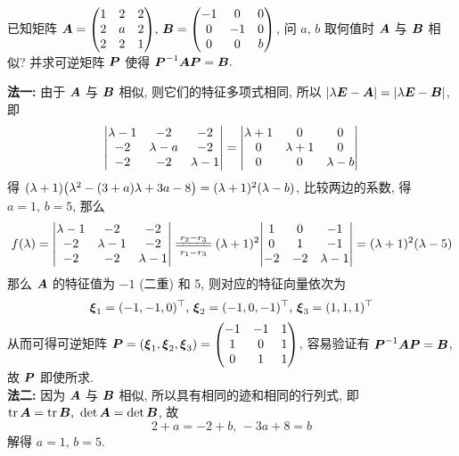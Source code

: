 \begin{example}[2009 兰州大学]
    已知矩阵 $\vb*{A}=\mqty(1&2&2\\2&a&2\\2&2&1)\text{, }\vb*{B}=\mqty(-1&0&0\\0&-1&0\\0&0&b)$, 问 $a\text{, }b$ 取何值时 $\vb*{A}$ 与 $\vb*{B}$ 相似? 并求可逆矩阵 $\vb*{P}$ 使得 $\vb*{P}^{-1}\vb*{AP}=\vb*{B}.$
\end{example}
\begin{solution}
    \textbf{法一: }由于 $\vb*{A}$ 与 $\vb*{B}$ 相似, 则它们的特征多项式相同, 所以 $|\lambda\vb*{E}-\vb*{A}|=|\lambda\vb*{E}-\vb*{B}|$, 即
    $$\mqty|\lambda-1 &-2 &-2\\-2 &\lambda-a &-2\\-2 &-2 &\lambda-1|=\mqty|\lambda+1 &0 &0\\0 &\lambda+1 &0\\0 &0 &\lambda-b|$$
    得 $(\lambda+1)\qty(\lambda^2-(3+a)\lambda+3a-8)=(\lambda+1)^2(\lambda-b)$, 比较两边的系数, 得 $a=1\text{, }b=5$, 那么
    $$f(\lambda)=\mqty|\lambda-1 &-2 &-2\\-2 &\lambda-1 &-2\\-2 &-2 &\lambda-1|\xlongequal[r_1-r_3]{r_2-r_3}(\lambda+1)^2\mqty|1 &0 &-1\\0 &1 &-1\\-2 &-2 &\lambda-1|=(\lambda+1)^2(\lambda-5)$$
    那么 $\vb*{A}$ 的特征值为 $-1$ (二重) 和 5, 则对应的特征向量依次为
    $$\vb*{\xi}_1=(-1,-1,0)^{\top}\text{, }\vb*{\xi}_2=(-1,0,-1)^{\top}\text{, }\vb*{\xi}_3=(1,1,1)^{\top}$$
    从而可得可逆矩阵 $\vb*{P}=(\vb*{\xi}_1,\vb*{\xi}_2,\vb*{\xi}_3)=\mqty(-1 &-1 &1\\1 &0 &1\\0 &1 &1)$, 容易验证有 $\vb*{P}^{-1}\vb*{AP}=\vb*{B}$, 故 $\vb*{P}$ 即使所求.\\
    \textbf{法二: }因为 $\vb*{A}$ 与 $\vb*{B}$ 相似, 所以具有相同的迹和相同的行列式, 即 $\tr\vb*{A}=\tr\vb*{B}\text{, }\det \vb*{A}=\det\vb*{B}$, 故
    $$2+a=-2+b\text{, }-3a+8=b$$ 解得 $a=1\text{, }b=5.$
\end{solution}

